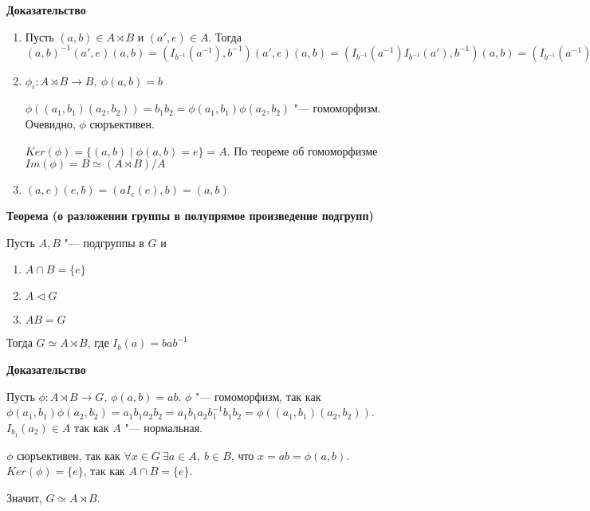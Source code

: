 \documentclass{article}
\begin{document}
\textbf{Доказательство}

\begin{enumerate}
	\item Пусть $(a, b) \in A \rtimes B$ и $(a', e) \in A$. Тогда $(a, b)^{-1}(a', e)(a, b) = (I_{b^{-1}}(a^{-1}), b^{-1})(a', e)(a, b) = (I_{b^{-1}}(a^{-1})I_{b^{-1}}(a'), b^{-1})(a, b) = (I_{b^{-1}}(a^{-1})I_{b^{-1}}(a')I_{b^{-1}}(a), e) \in A$
	\item $\phi_i: A \rtimes B \rightarrow B, \  \phi(a, b) = b$
	
	$\phi((a_1, b_1)(a_2, b_2)) = b_1b_2 = \phi(a_1, b_1)\phi(a_2, b_2)$ "--- гомоморфизм. Очевидно, $\phi$ сюръективен.
	
	$Ker(\phi) = \{(a, b) \mid \phi(a, b) = e\} = A$. По теореме об гомоморфизме $Im(\phi) = B \simeq (A \rtimes B)/A$
	
	\item $(a, e)(e, b) = (aI_e(e), b) = (a, b)$
\end{enumerate}

\vspace{10pt}

\textbf{Теорема (о разложении группы в полупрямое произведение подгрупп)}

Пусть $A, B$ "--- подгруппы в $G$ и
\begin{enumerate}
	\item $A \cap B = \{e\}$
	\item $A \triangleleft G$
	\item $AB = G$
\end{enumerate}

Тогда $G \simeq A \rtimes B$, где $I_b(a) = bab^{-1}$

\vspace{5pt}

\textbf{Доказательство}

Пусть $\phi: A \rtimes B \rightarrow G$, $\phi(a, b) = ab$. $\phi$ "--- гомоморфизм, так как $\phi(a_1, b_1)\phi(a_2, b_2) = a_1b_1a_2b_2 = a_1b_1a_2b_1^{-1}b_1b_2 = \phi((a_1, b_1)(a_2, b_2))$. $I_{b_1}(a_2) \in A$ так как $A$ "--- нормальная.

$\phi$ сюръективен, так как $\forall x \in G \  \exists a \in A, \  b \in B$, что $x = ab = \phi(a, b)$. $Ker(\phi) = \{e\}$, так как $A \cap B = \{e\}$.

Значит, $G \simeq A \rtimes B$.

\vspace{10pt}
\end{document}
